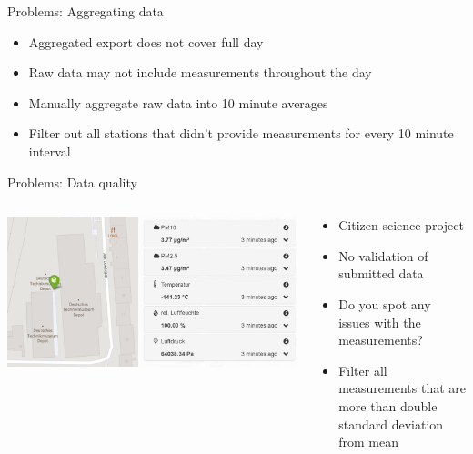 \begin{frame}{Problems: Aggregating data}
	\begin{itemize}
		\item Aggregated export does not cover full day
		\item Raw data may not include measurements throughout the day
		\item<2-> Manually aggregate raw data into 10 minute averages
		\item<2-> Filter out all stations that didn't provide measurements for every 10 minute interval
	\end{itemize}
\end{frame}
\begin{frame}{Problems: Data quality}
\begin{columns}[c] %
	\begin{column}{.55\textwidth}
		\includegraphics[width=\linewidth]{../writeup/images/outliers.png}
	\end{column}%
	\hfill%
	\begin{column}{.45\textwidth}
		\begin{itemize}
			\item Citizen-science project
			\item No validation of submitted data
			\item Do you spot any issues with the measurements?
			\item<2-> Filter all measurements that are more than double standard deviation from mean
		\end{itemize}
	\end{column}%
\end{columns}
\end{frame}
